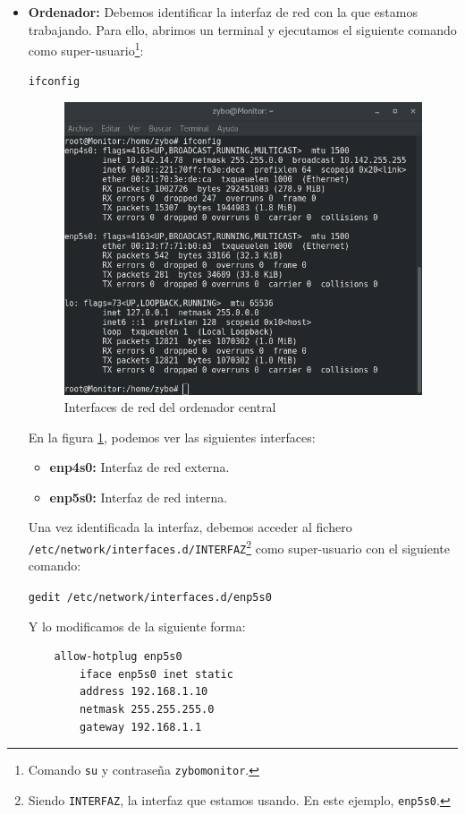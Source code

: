\begin{itemize}
	\item \textbf{Ordenador:} Debemos identificar la interfaz de red con la que estamos trabajando. Para ello, abrimos un terminal y ejecutamos el siguiente comando como super-usuario\footnote{Comando \texttt{su} y contraseña \texttt{zybomonitor}.}:
	\begin{center}
		\texttt{ifconfig}
	\end{center}
	\newpage
	\begin{figure}[h]
		\centering
		\includegraphics[scale=0.5]{Anexos/Anexo2/Infraestructura/ifconfigPC.png}
		\caption{Interfaces de red del ordenador central}
		\label{Interfaces de red del ordenador central}
	\end{figure}
	
	En la figura \ref{Interfaces de red del ordenador central}, podemos ver las siguientes interfaces:
	\begin{itemize}
		\item \textbf{enp4s0:} Interfaz de red externa.
		\item \textbf{enp5s0:} Interfaz de red interna.
	\end{itemize}
	
	Una vez identificada la interfaz, debemos acceder al fichero\\ \texttt{/etc/network/interfaces.d/INTERFAZ}\footnote{Siendo \texttt{INTERFAZ}, la interfaz que estamos usando. En este ejemplo, \texttt{enp5s0}.} como super-usuario con el siguiente comando:
	\begin{center}
		\texttt{gedit /etc/network/interfaces.d/enp5s0}
	\end{center}
	Y lo modificamos de la siguiente forma:
	\begin{lstlisting}
	allow-hotplug enp5s0
	    iface enp5s0 inet static
	    address 192.168.1.10
	    netmask 255.255.255.0
	    gateway 192.168.1.1
	\end{lstlisting}
	

\end{itemize}
